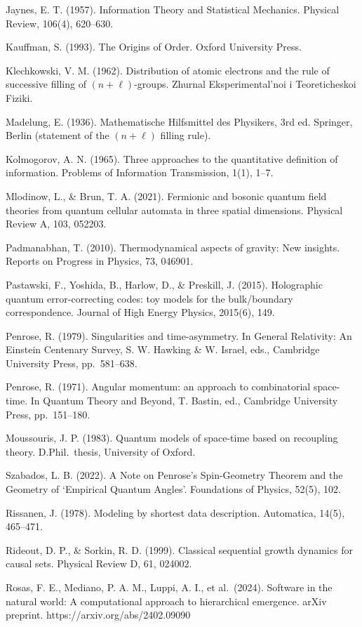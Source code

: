 \documentclass[11pt,oneside]{report}
\theoremstyle{definition}
\theoremstyle{remark}
\newenvironment{reflist}
  {\par\small\setlength{\parindent}{0pt}%
   \setlength{\leftskip}{1.6em}\setlength{\parindent}{-1.6em}%
   \setlength{\parskip}{0.4em}%
   \raggedright\hyphenpenalty=50\exhyphenpenalty=50\relax
   \sloppy}
  {\par}
\begin{document}
\begin{reflist}
Jaynes, E. T. (1957). Information Theory and Statistical Mechanics.
Physical Review, 106(4), 620--630.

Kauffman, S. (1993). The Origins of Order. Oxford University Press.

Klechkowski, V. M. (1962). Distribution of atomic electrons and the rule
of successive filling of \ensuremath{(n+\ell)}-groups. Zhurnal Eksperimental'noi i
Teoreticheskoi Fiziki.

Madelung, E. (1936). Mathematische Hilfsmittel des Physikers, 3rd ed.
Springer, Berlin (statement of the \ensuremath{(n+\ell)} filling rule).

Kolmogorov, A. N. (1965). Three approaches to the quantitative
definition of information. Problems of Information Transmission, 1(1),
1--7.

Mlodinow, L., \& Brun, T. A. (2021). Fermionic and bosonic quantum field
theories from quantum cellular automata in three spatial dimensions.
Physical Review A, 103, 052203.

Padmanabhan, T. (2010). Thermodynamical aspects of gravity: New
insights. Reports on Progress in Physics, 73, 046901.

Pastawski, F., Yoshida, B., Harlow, D., \& Preskill, J. (2015).
Holographic quantum error-correcting codes: toy models for the
bulk/boundary correspondence. Journal of High Energy Physics, 2015(6),
149.

Penrose, R. (1979). Singularities and time-asymmetry. In General
Relativity: An Einstein Centenary Survey, S. W. Hawking \& W. Israel,
eds., Cambridge University Press, pp.~581--638.

Penrose, R. (1971). Angular momentum: an approach to combinatorial
space-time. In Quantum Theory and Beyond, T. Bastin, ed., Cambridge
University Press, pp.~151--180.

Moussouris, J. P. (1983). Quantum models of space-time based on
recoupling theory. D.Phil.\ thesis, University of Oxford.

Szabados, L. B. (2022). A Note on Penrose's Spin-Geometry Theorem and the
Geometry of `Empirical Quantum Angles'. Foundations of Physics, 52(5),
102.

Rissanen, J. (1978). Modeling by shortest data description. Automatica,
14(5), 465--471.

Rideout, D. P., \& Sorkin, R. D. (1999). Classical sequential growth
dynamics for causal sets. Physical Review D, 61, 024002.

Rosas, F. E., Mediano, P. A. M., Luppi, A. I., et al.~(2024). Software
in the natural world: A computational approach to hierarchical
emergence. arXiv preprint. https://arxiv.org/abs/2402.09090


\end{reflist}
\end{document}
